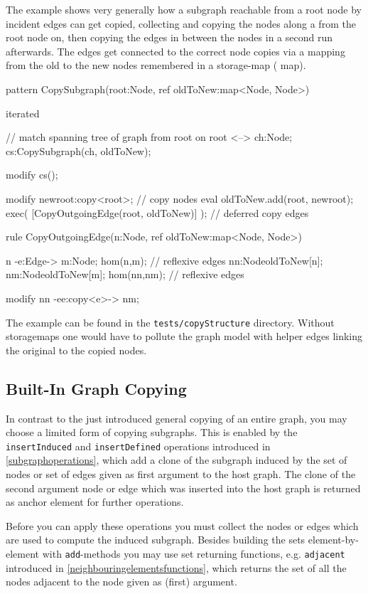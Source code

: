   \begin{example}
The example shows very generally how a subgraph reachable from a root node by incident edges can get copied, collecting and copying the nodes along a  from the root node on, then copying the edges in between the nodes in a second run afterwards. The edges get connected to the correct node copies via a mapping from the old to the new nodes remembered in a storage-map ( map).
    \begin{grgen}
pattern CopySubgraph(root:Node, ref oldToNew:map<Node, Node>)
{
  iterated { // match spanning tree of graph from root on
    root <--> ch:Node;
    cs:CopySubgraph(ch, oldToNew);

    modify {
      cs();
    }
  }

  modify {
    newroot:copy<root>; // copy nodes
    eval { oldToNew.add(root, newroot); }
    exec( [CopyOutgoingEdge(root, oldToNew)] ); // deferred copy edges
  }
}

rule CopyOutgoingEdge(n:Node, ref oldToNew:map<Node, Node>)
{
  n -e:Edge-> m:Node;
  hom(n,m); // reflexive edges
  nn:Node{oldToNew[n]}; nm:Node{oldToNew[m]};
  hom(nn,nm); // reflexive edges

  modify {
    nn -ee:copy<e>-> nm;
  }
}
    \end{grgen}
  \end{example}

The example can be found in the \texttt{tests/copyStructure} directory.
Without storagemaps one would have to pollute the graph model with helper edges linking the original to the copied nodes.

\subsection{Built-In Graph Copying}\label{builtingraphcopying}
In contrast to the just introduced general copying of an entire graph, you may choose a limited form of copying subgraphs.
This is enabled by the \texttt{insertInduced} and \texttt{insertDefined} operations introduced in \ref{subgraphoperations}, which add a clone of the subgraph induced by the set of nodes or set of edges given as first argument to the host graph.
The clone of the second argument node or edge which was inserted into the host graph is returned as anchor element for further operations.

Before you can apply these operations you must collect the nodes or edges which are used to compute the induced subgraph.
Besides building the sets element-by-element with \texttt{add}-methods you may use set returning functions, e.g. \texttt{adjacent} introduced in \ref{neighbouringelementsfunctions}, which returns the set of all the nodes adjacent to the node given as (first) argument.


